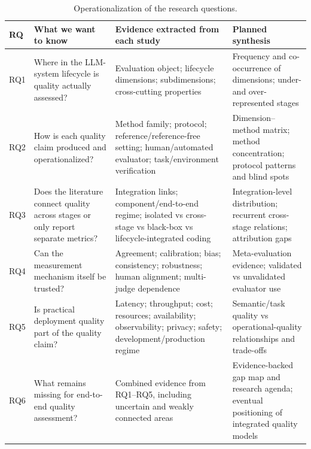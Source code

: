 \begin{table}[t]
\caption{Operationalization of the research questions.}
\label{tab:rq-operationalization}
\begin{tabular}{p{} p{} p{} p{}}
\toprule
\textbf{RQ} & \textbf{What we want to know} & \textbf{Evidence extracted from each study} & \textbf{Planned synthesis} \\
\midrule
RQ1 & Where in the LLM-system lifecycle is quality actually assessed? & Evaluation object; lifecycle dimensions; subdimensions; cross-cutting properties & Frequency and co-occurrence of dimensions; under- and over-represented stages \\
RQ2 & How is each quality claim produced and operationalized? & Method family; protocol; reference/reference-free setting; human/automated evaluator; task/environment verification & Dimension--method matrix; method concentration; protocol patterns and blind spots \\
RQ3 & Does the literature connect quality across stages or only report separate metrics? & Integration links; component/end-to-end regime; isolated vs cross-stage vs black-box vs lifecycle-integrated coding & Integration-level distribution; recurrent cross-stage relations; attribution gaps \\
RQ4 & Can the measurement mechanism itself be trusted? & Agreement; calibration; bias; consistency; robustness; human alignment; multi-judge dependence & Meta-evaluation evidence; validated vs unvalidated evaluator use \\
RQ5 & Is practical deployment quality part of the quality claim? & Latency; throughput; cost; resources; availability; observability; privacy; safety; development/production regime & Semantic/task quality vs operational-quality relationships and trade-offs \\
RQ6 & What remains missing for end-to-end quality assessment? & Combined evidence from RQ1--RQ5, including uncertain and weakly connected areas & Evidence-backed gap map and research agenda; eventual positioning of integrated quality models \\
\bottomrule
\end{tabular}
\end{table}
